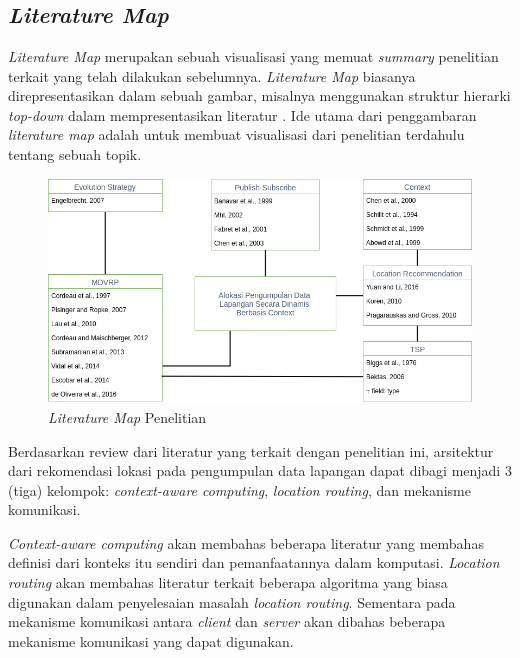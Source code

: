 \chapter{\babDua}


\section{\textit{Literature Map}}
\label{sec:literature-map}
\textit{Literature Map} merupakan sebuah visualisasi yang memuat \textit{summary} penelitian terkait yang telah dilakukan sebelumnya. \textit{Literature Map} biasanya direpresentasikan dalam sebuah gambar, misalnya menggunakan struktur hierarki \textit{top-down} dalam mempresentasikan literatur \citep{creswell_research_2013}. Ide utama dari penggambaran \textit{literature map} adalah untuk membuat visualisasi dari penelitian terdahulu tentang sebuah topik.


\begin{figure}[h]
	\centering
	\includegraphics[width=\textwidth]{../../Resources/Images/literature-map}
	\caption{\textit{Literature Map} Penelitian}
	\label{fig:literature-map}
\end{figure}


Berdasarkan review dari literatur yang terkait dengan penelitian ini, arsitektur dari rekomendasi lokasi pada pengumpulan data lapangan dapat dibagi menjadi 3 (tiga) kelompok: \textit{context-aware computing}, \textit{location routing}, dan mekanisme komunikasi.


\textit{Context-aware computing} akan membahas beberapa literatur yang membahas definisi dari konteks itu sendiri dan pemanfaatannya dalam komputasi. \textit{Location routing} akan membahas literatur terkait beberapa algoritma yang biasa digunakan dalam penyelesaian masalah \textit{location routing}. Sementara pada mekanisme komunikasi antara \textit{client} dan \textit{server} akan dibahas beberapa mekanisme komunikasi yang dapat digunakan.


